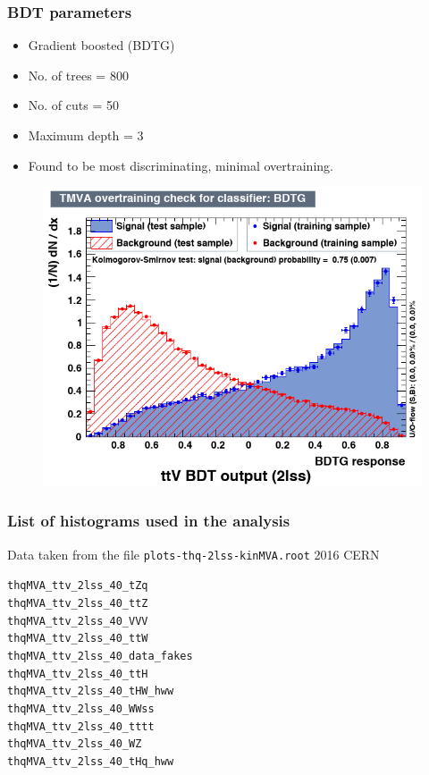 \documentclass[11pt]{beamer}
\begin{document}
\begin{frame}
\frametitle{BDT parameters}

\begin{itemize}
\item Gradient boosted (BDTG)
\item No. of trees = 800
\item No. of cuts = 50
\item Maximum depth = 3
\item Found to be most discriminating, minimal overtraining.
\end{itemize}
\end{frame}

\begin{frame}
\begin{center}
	\begin{figure}
		\includegraphics[scale=0.5]{figures/sk.png}
	\end{figure}
\end{center}
\end{frame}

\begin{frame}
\frametitle{List of histograms used in the analysis}
Data taken from the file \texttt{plots-thq-2lss-kinMVA.root} 2016 CERN 
\begin{alltt}
thqMVA\_ttv\_2lss\_40\_tZq \\
thqMVA\_ttv\_2lss\_40\_ttZ\\
thqMVA\_ttv\_2lss\_40\_VVV\\
thqMVA\_ttv\_2lss\_40\_ttW\\
thqMVA\_ttv\_2lss\_40\_data\_fakes\\
thqMVA\_ttv\_2lss\_40\_ttH\\
thqMVA\_ttv\_2lss\_40\_tHW\_hww\\
thqMVA\_ttv\_2lss\_40\_WWss\\
thqMVA\_ttv\_2lss\_40\_tttt\\
thqMVA\_ttv\_2lss\_40\_WZ\\
thqMVA\_ttv\_2lss\_40\_tHq\_hww\\
\end{alltt}
\end{frame}
\end{document}
